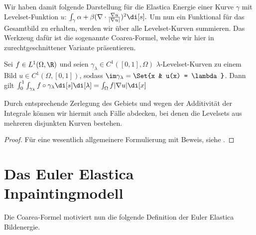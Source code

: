 \documentclass{mythesis}
\begin{document}
Wir haben damit folgende Darstellung für die Elastica Energie einer Kurve $\gamma$ mit Levelset-Funktion $u$:
\begin{math}
    \int_\gamma \alpha + \beta (\nabla \cdot \frac{\nabla u}{|\nabla u|})^2 \di[s].
\end{math}
Um nun ein Funktional für das Gesamtbild zu erhalten, werden wir über alle Levelset-Kurven summieren.
Das Werkzeug dafür ist die sogenannte Coarea-Formel, welche wir hier in zurechtgeschnittener Variante präsentieren.

\begin{proposition} \label{satz:coarea}
    Sei $f \in L^1(\Omega, \R)$ und seien $\gamma_\lambda \in C^1([0,1], \Omega)$ $\lambda$-Levelset-Kurven zu einem Bild $u \in C^1(\Omega, [0,1])$, sodass $\im \gamma_\lambda = \Set{x & u(x) = \lambda}$.
    Dann gilt
    \begin{math}
	\int_0^1 \int_{\gamma_\lambda} f \circ \gamma_\lambda \di[s] \di[\lambda]
	= \int_\Omega f |\nabla u| \di[x]
    \end{math}
    \begin{note}
        Durch entsprechende Zerlegung des Gebiets und wegen der Additivität der Integrale können wir hiermit auch Fälle abdecken, bei denen die Levelsets aus mehreren disjunkten Kurven bestehen.
    \end{note}
    \begin{proof}
        Für eine wesentlich allgemeinere Formulierung mit Beweis, siehe \cite[§3.4]{evans2015measure}.
    \end{proof}
\end{proposition}


\section{Das Euler Elastica Inpaintingmodell}


Die Coarea-Formel motiviert nun die folgende Definition der Euler Elastica Bildenergie.
\end{document}
